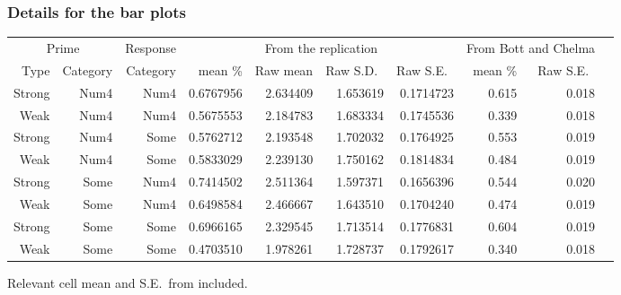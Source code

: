 \documentclass[noamssymb]{beamer}
\begin{document}
\begin{frame}
  \frametitle{{\ftf Details for the bar plots}}

\begin{adjustbox}{width=1\textwidth,center=\textwidth}
    \begin{tabular}{rrrrrrrrrr}
      \hline
      \multicolumn{2}{c}{Prime} & Response & \multicolumn{4}{c}{From the replication} & \multicolumn{2}{c}{From Bott and Chelma} \\
      \cline{1-3}
      Type & Category & Category  & mean \% & Raw mean & Raw S.D.\ & Raw S.E.\ &  mean \%  & Raw S.E.\  \\
      \hline
      Strong & Num4 &  Num4 &   0.6767956 &  2.634409 & 1.653619 & 0.1714723  & 0.615 & 0.018   \\
      Weak & Num4 &  Num4 &   0.5675553 &  2.184783 & 1.683334 & 0.1745536  & 0.339 & 0.018    \\
      Strong & Num4 &  Some &   0.5762712 &  2.193548 & 1.702032 & 0.1764925  & 0.553 & 0.019    \\
      Weak & Num4 &  Some &   0.5833029 &  2.239130 & 1.750162 & 0.1814834  & 0.484 & 0.019    \\
      Strong & Some &  Num4 &   0.7414502 &  2.511364 & 1.597371 & 0.1656396  & 0.544 & 0.020    \\
      Weak & Some &  Num4 &   0.6498584 &  2.466667 & 1.643510 & 0.1704240  & 0.474 & 0.019    \\
      Strong & Some &  Some &   0.6966165 &  2.329545 & 1.713514 & 0.1776831  & 0.604 & 0.019    \\
      Weak & Some &  Some &   0.4703510 &  1.978261 & 1.728737 & 0.1792617 & 0.340 & 0.018     \\
      \hline
    \end{tabular}
  \end{adjustbox}

  Relevant cell mean and S.E.\ from \citeauthor{Bott:2016aa} included.
\end{frame}
\end{document}
